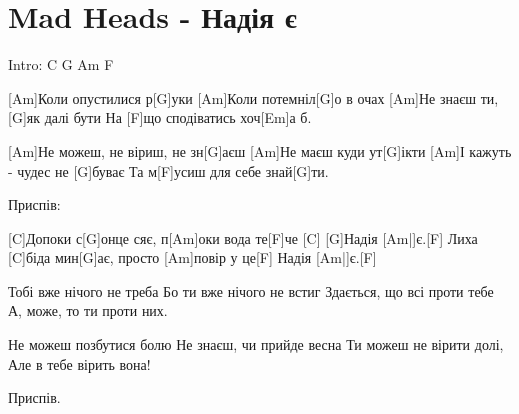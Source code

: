\section{Mad Heads - Надія є}
\begin{guitar}
Intro: C G Am F

[Am]Коли опустилися р[G]уки
[Am]Коли потемніл[G]о в очах
[Am]Не знаєш ти, [G]як далі бути
На [F]що сподіватись хоч[Em]а б.

[Am]Не можеш, не віриш, не зн[G]аєш
[Am]Не маєш куди ут[G]ікти
[Am]І кажуть - чудес не [G]буває
Та м[F]усиш для себе знай[G]ти.

Приспів:

[C]Допоки с[G]онце сяє, п[Am]оки вода те[F]че
[C]  [G]Надія [Am|]є.[F] \newline
Лиха [C]біда мин[G]ає, просто [Am]повір у це[F] \newline
[C]  [G]Надія [Am|]є.[F] \newline

Тобі вже нічого не треба
Бо ти вже нічого не встиг
Здається, що всі проти тебе
А, може, то ти проти них.

Не можеш позбутися болю
Не знаєш, чи прийде весна
Ти можеш не вірити долі,
Але в тебе вірить вона!

Приспів.
\end{guitar}